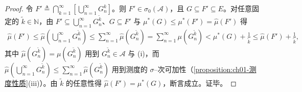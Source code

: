 \documentclass[../../main.tex]{subfiles}%
\begin{document}
\begin{proof}
令 $F'\triangleq\bigcap_{k=1}^\infty\left[\bigcup_{n=1}^\infty G_n^k\right]$。则 $F'\in\sigma_0(\mathcal{A})$，且 $G\subseteq F'\subseteq E$。对任意固定的 $\widetilde{k}\in\mathbb{N}$，由 $F'\subseteq\bigcup_{n=1}^\infty G_n^{\widetilde{k}}$、$G\subseteq F'$ 与 $\mu^*(G)\leqslant\mu^*(F')=\widehat{\mu}(F')$ 得
\begin{align*}
\widehat{\mu}(F')\leqslant\widehat{\mu}\left(\bigcup_{n=1}^\infty G_n^{\widetilde{k}}\right)\leqslant\sum_{n=1}^\infty\widehat{\mu}(G_n^{\widetilde{k}})=\sum_{n=1}^\infty\mu(G_n^{\widetilde{k}})<\mu^*(G)+\frac{1}{\widetilde{k}}\leqslant\widehat{\mu}(F')+\frac{1}{\widetilde{k}},
\end{align*}
其中 $\widehat{\mu}(G_n^{\widetilde{k}})=\mu(G_n^{\widetilde{k}})$ 用到 $G_n^{\widetilde{k}}\in\mathcal{A}$ 与 (i)，而 $\widehat{\mu}\left(\bigcup_{n=1}^\infty G_n^{\widetilde{k}}\right)\leqslant\sum_{n=1}^\infty\widehat{\mu}(G_n^{\widetilde{k}})$ 用到测度的 $\sigma$--次可加性（\cref{proposition:ch01-测度性质}(iii)）。由 $\widetilde{k}$ 的任意性得 $\widehat{\mu}(F')=\mu^*(G)$，断言成立。证毕。
\end{proof}
\end{document}
